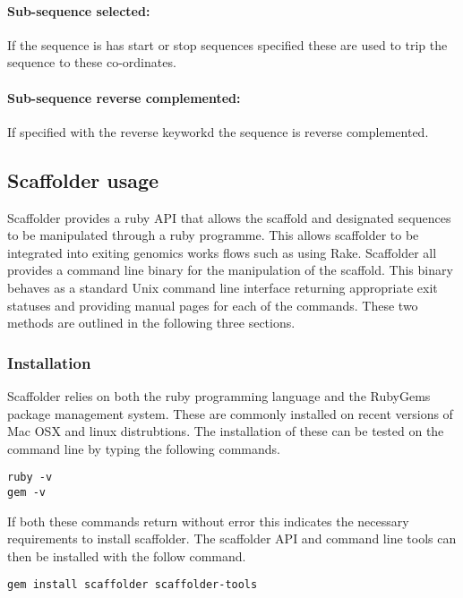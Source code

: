 \documentclass[10pt]{bmc_article}
\newenvironment{bmcformat}{\begin{raggedright}\baselineskip20pt\sloppy\setboolean{publ}{false}}{\end{raggedright}\baselineskip20pt\sloppy}
\begin{document}
\begin{bmcformat}
\paragraph{Sub-sequence selected:} If the sequence is has start or stop
sequences specified these are used to trip the sequence to these co-ordinates.
\pb 

\paragraph{Sub-sequence reverse complemented: } If specified with the reverse keyworkd the sequence is reverse complemented.
\pb

\subsection*{Scaffolder usage} %

Scaffolder provides a ruby API that allows the scaffold and designated
sequences to be manipulated through a ruby programme. This allows scaffolder to
be integrated into exiting genomics works flows such as using Rake.  Scaffolder
all provides a command line binary for the manipulation of the scaffold. This
binary behaves as a standard Unix command line interface returning appropriate
exit statuses and providing manual pages for each of the commands. These two
methods are outlined in the following three sections. \pb

\subsubsection*{Installation} %

Scaffolder relies on both the ruby programming language and the RubyGems
package management system. These are commonly installed on recent versions of
Mac OSX and linux distrubtions. The installation of these can be tested on the
command line by typing the following commands. \pb

\begin{verbatim}
ruby -v
gem -v
\end{verbatim}

If both these commands return without error this indicates the necessary
requirements to install scaffolder. The scaffolder API and command line tools
can then be installed with the follow command.

\begin{verbatim}
gem install scaffolder scaffolder-tools
\end{verbatim}


\end{bmcformat}
\end{document}
